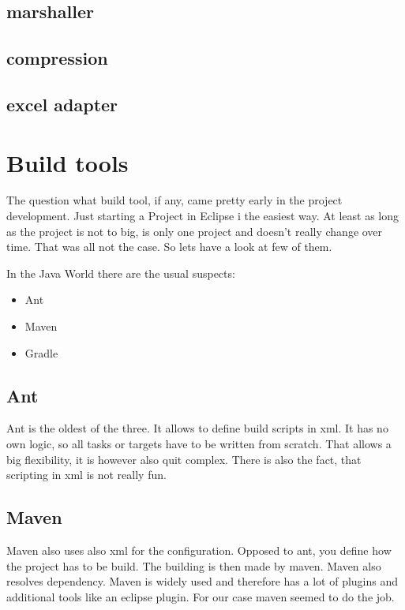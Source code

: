 \documentclass[paper=a4,twoside=false,BCOR=0mm,DIV=calc,fontsize=12pt]{scrartcl}
\begin{document}
\subsection{marshaller}


\subsection{compression}


\subsection{excel adapter}






\section{Build tools}
The question what build tool, if any, came pretty early in the project development. Just starting a Project in Eclipse i the easiest way. 
At least as long as the project is not to big, is only one project and doesn't really change over time. That was all not the case. So lets have a look at few of them. 

In the Java World there are the usual suspects:
\begin{itemize}
 \item Ant
 \item Maven
 \item Gradle
\end{itemize}

\subsection{Ant}
Ant is the oldest of the three. It allows to define build scripts in xml. 
It has no own logic, so all tasks or targets have to be written from scratch.
That allows a big flexibility, it is however also quit complex. There is also the fact,
that scripting in xml is not really fun.


\subsection{Maven}
Maven also uses also xml for the configuration. Opposed to ant, you define how the project has to be build. The building is then
made by maven. Maven also resolves dependency. Maven is widely used and therefore has a lot of plugins and additional tools like an eclipse plugin. For our case maven seemed to do the job.
\end{document}
